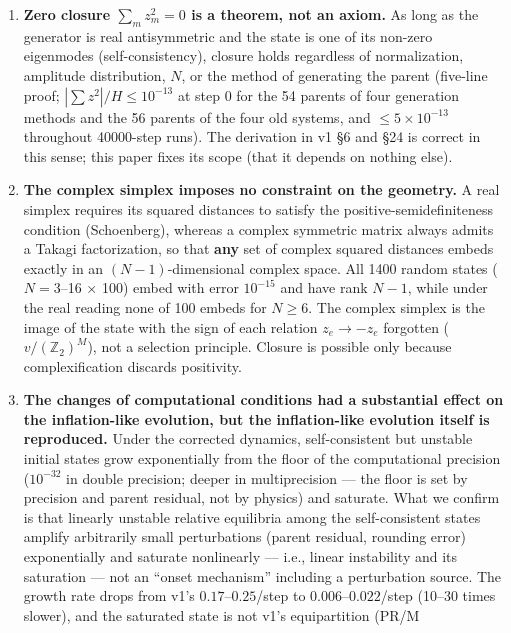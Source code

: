 \documentclass[
  10pt,
  a4paper,
]{article}
\newcounter{none} %
\providecommand{\tightlist}{%
  \setlength{\itemsep}{0pt}\setlength{\parskip}{0pt}}
\begin{document}
\begin{enumerate}
\def\labelenumi{\arabic{enumi}.}
\tightlist
\item
  \textbf{Zero closure \(\sum_m z_m^2=0\) is a theorem, not an axiom.}
  As long as the generator is real antisymmetric and the state is one of
  its non-zero eigenmodes (self-consistency), closure holds regardless
  of normalization, amplitude distribution, \(N\), or the method of
  generating the parent (five-line proof; \(|\sum z^2|/H\le10^{-13}\) at
  step 0 for the 54 parents of four generation methods and the 56
  parents of the four old systems, and \(\le5\times10^{-13}\) throughout
  40000-step runs). The derivation in v1 §6 and §24 is correct in this
  sense; this paper fixes its scope (that it depends on nothing else).
\item
  \textbf{The complex simplex imposes no constraint on the geometry.} A
  real simplex requires its squared distances to satisfy the
  positive-semidefiniteness condition (Schoenberg), whereas a complex
  symmetric matrix always admits a Takagi factorization, so that
  \textbf{any} set of complex squared distances embeds exactly in an
  \((N-1)\)-dimensional complex space. All 1400 random states
  (\(N=3\)--16 × 100) embed with error \(10^{-15}\) and have rank
  \(N-1\), while under the real reading none of 100 embeds for
  \(N\ge6\). The complex simplex is the image of the state with the sign
  of each relation \(z_e\to-z_e\) forgotten (\(v/(\mathbb Z_2)^M\)), not
  a selection principle. Closure is possible only because
  complexification discards positivity.
\item
  \textbf{The changes of computational conditions had a substantial
  effect on the inflation-like evolution, but the inflation-like
  evolution itself is reproduced.} Under the corrected dynamics,
  self-consistent but unstable initial states grow exponentially from
  the floor of the computational precision (\(10^{-32}\) in double
  precision; deeper in multiprecision --- the floor is set by precision
  and parent residual, not by physics) and saturate. What we confirm is
  that linearly unstable relative equilibria among the self-consistent
  states amplify arbitrarily small perturbations (parent residual,
  rounding error) exponentially and saturate nonlinearly --- i.e.,
  linear instability and its saturation --- not an ``onset mechanism''
  including a perturbation source. The growth rate drops from v1's
  \(0.17\)--\(0.25\)/step to \(0.006\)--\(0.022\)/step (10--30 times
  slower), and the saturated state is not v1's equipartition (PR/M

\end{enumerate}
\end{document}
